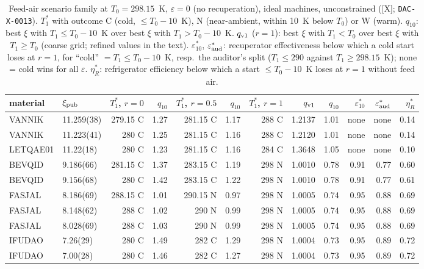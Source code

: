 \documentclass[10pt]{article}
\newcommand{\tier}[1]{\textsf{[#1]}}
\newcommand{\tX}{\tier{X}}
\newcommand{\id}[1]{\texttt{DAC-#1}}
\begin{document}
\begin{table}[h]\centering\footnotesize\setlength{\tabcolsep}{3pt}
\caption{Feed-air scenario family at $T_0=298.15$~K, $\varepsilon=0$ (no recuperation), ideal machines, unconstrained (\tX; \id{X-0013}). $T_1^\ast$ with outcome C (cold, $\le T_0-10$~K), N (near-ambient, within 10~K below $T_0$) or W (warm). $q_{10}$: best $\xi$ with $T_1\le T_0-10$~K over best $\xi$ with $T_1>T_0-10$~K. $q_{\rm v1}$ ($r=1$): best $\xi$ with $T_1<T_0$ over best $\xi$ with $T_1\ge T_0$ (coarse grid; refined values in the text). $\varepsilon^\ast_{10}$, $\varepsilon^\ast_{\rm aud}$: recuperator effectiveness below which a cold start loses at $r=1$, for ``cold'' $=T_1\le T_0-10$~K, resp.\ the auditor's split ($T_1\le290$ against $T_1\ge298.15$~K); none = cold wins for all $\varepsilon$. $\eta_R^\ast$: refrigerator efficiency below which a start $\le T_0-10$~K loses at $r=1$ without feed air.}\label{tab:air}
\begin{tabular}{llrrrrrrrrrr}\toprule
material & $\xi_{\rm pub}$ & $T_1^\ast$, $r{=}0$ & $q_{10}$ & $T_1^\ast$, $r{=}0.5$ & $q_{10}$ & $T_1^\ast$, $r{=}1$ & $q_{\rm v1}$ & $q_{10}$ & $\varepsilon^\ast_{10}$ & $\varepsilon^\ast_{\rm aud}$ & $\eta_R^\ast$\\\midrule
VANNIK & 11.259(38) & 279.15 C & 1.27 & 281.15 C & 1.17 & 288 C & 1.2137 & 1.01 & none & none & 0.14\\
VANNIK & 11.223(41) & 280 C & 1.25 & 281.15 C & 1.16 & 288 C & 1.2120 & 1.01 & none & none & 0.14\\
LETQAE01 & 11.22(18) & 280 C & 1.23 & 281.15 C & 1.16 & 284 C & 1.3648 & 1.05 & none & none & 0.10\\
BEVQID & 9.186(66) & 281.15 C & 1.37 & 283.15 C & 1.19 & 298 N & 1.0010 & 0.78 & 0.91 & 0.77 & 0.60\\
BEVQID & 9.156(68) & 280 C & 1.42 & 283.15 C & 1.22 & 298 N & 1.0010 & 0.78 & 0.91 & 0.77 & 0.61\\
FASJAL & 8.186(69) & 288.15 C & 1.01 & 290.15 N & 0.97 & 298 N & 1.0005 & 0.74 & 0.95 & 0.88 & 0.69\\
FASJAL & 8.148(62) & 288 C & 1.02 & 290 N & 0.99 & 298 N & 1.0005 & 0.74 & 0.95 & 0.88 & 0.69\\
FASJAL & 8.028(69) & 288 C & 1.03 & 290 N & 0.99 & 298 N & 1.0005 & 0.74 & 0.95 & 0.88 & 0.69\\
IFUDAO & 7.26(29) & 280 C & 1.49 & 282 C & 1.29 & 298 N & 1.0004 & 0.73 & 0.95 & 0.89 & 0.72\\
IFUDAO & 7.00(28) & 280 C & 1.46 & 282 C & 1.27 & 298 N & 1.0004 & 0.73 & 0.95 & 0.89 & 0.72\\

\end{tabular}
\end{table}
\end{document}
